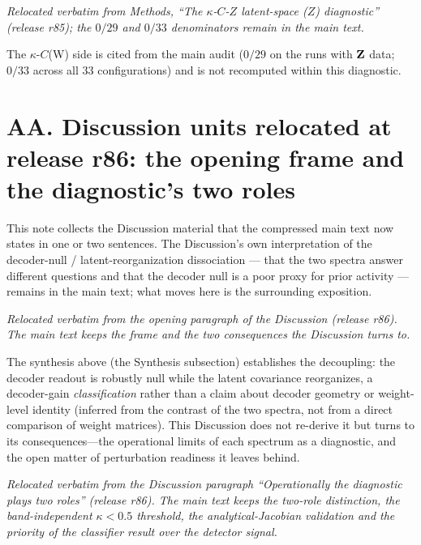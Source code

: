 \documentclass[11 pt,a4 paper]{article}
\begin{document}
\noindent\emph{Relocated verbatim from Methods, ``The $\kappa$-$C$-$Z$ latent-space ($Z$) diagnostic'' (release r85); the $0/29$ and $0/33$ denominators remain in the main text.}

The $\kappa$-$C$(W) side is cited from the main audit ($0/29$ on the runs with $\mathbf{Z}$ data; $0/33$ across all 33 configurations) and is not recomputed within this diagnostic.



\clearpage

\section*{AA. Discussion units relocated at release r86: the opening frame and the diagnostic's two roles}

This note collects the Discussion material that the compressed main text now states in one or
two sentences. The Discussion's own interpretation of the decoder-null / latent-reorganization
dissociation --- that the two spectra answer different questions and that the decoder null is a
poor proxy for prior activity --- remains in the main text; what moves here is the surrounding
exposition.

\noindent\emph{Relocated verbatim from the opening paragraph of the Discussion (release r86). The main text keeps the frame and the two consequences the Discussion turns to.}

The synthesis above (the Synthesis subsection) establishes the decoupling: the decoder readout is robustly null while the latent covariance reorganizes, a decoder-gain \emph{classification} rather than a claim about decoder geometry or weight-level identity (inferred from the contrast of the two spectra, not from a direct comparison of weight matrices). This Discussion does not re-derive it but turns to its consequences---the operational limits of each spectrum as a diagnostic, and the open matter of perturbation readiness it leaves behind.

\noindent\emph{Relocated verbatim from the Discussion paragraph ``Operationally the diagnostic plays two roles'' (release r86). The main text keeps the two-role distinction, the band-independent $\kappa<0.5$ threshold, the analytical-Jacobian validation and the priority of the classifier result over the detector signal.}
\end{document}
